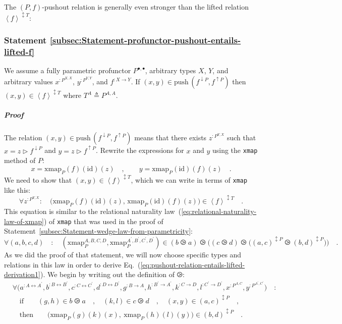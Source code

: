 The $\left(P,f\right)$-pushout relation is generally even stronger
than the lifted relation $\left<f\right>^{\updownarrow T}$:

\subsubsection{Statement \label{subsec:Statement-profunctor-pushout-entails-lifted-f}\ref{subsec:Statement-profunctor-pushout-entails-lifted-f}}

We assume a fully parametric profunctor $P^{\bullet,\bullet}$, arbitrary
types $X$, $Y$, and arbitrary values $x^{:P^{X,X}}$, $y^{:P^{Y,Y}}$,
and $f^{:X\rightarrow Y}$. If $(x,y)\in\text{push}\,(f^{\downarrow P},f^{\uparrow P})$
then $(x,y)\in\left<f\right>^{\updownarrow T}$ where $T^{A}\triangleq P^{A,A}$.

\subparagraph{Proof}

The relation $(x,y)\in\text{push}\,(f^{\downarrow P},f^{\uparrow P})$
means that there exists $z^{:P^{Y,X}}$ such that $x=z\triangleright f^{\downarrow P}$
and $y=z\triangleright f^{\uparrow P}$. Rewrite the expressions for
$x$ and $y$ using the \lstinline!xmap! method of $P$:
\[
x=\text{xmap}_{P}(f)(\text{id})(z)\quad,\quad\quad y=\text{xmap}_{P}(\text{id})(f)(z)\quad.
\]
We need to show that $(x,y)\in\left<f\right>^{\updownarrow T}$, which
we can write in terms of \lstinline!xmap! like this:
\begin{equation}
\forall z^{:P^{Y,X}}:\quad\big(\text{xmap}_{P}(f)(\text{id})(z),\,\text{xmap}_{P}(\text{id})(f)(z)\big)\in\left<f\right>^{\updownarrow T}\quad.\label{eq:pushout-relation-entails-lifted-derivation1}
\end{equation}
This equation is similar to the relational naturality law~(\ref{eq:relational-naturality-law-of-xmap})
of \lstinline!xmap! that was used in the proof of Statement~\ref{subsec:Statement-wedge-law-from-parametricity}:
\[
\forall(a,b,c,d)\quad:\quad(\text{xmap}_{P}^{A,B,C,D},\text{xmap}_{P}^{A^{\prime},B^{\prime},C^{\prime},D^{\prime}})\in(b\ogreaterthan a)\ogreaterthan\big((c\ogreaterthan d)\ogreaterthan\big((a,c)^{\updownarrow P}\ogreaterthan(b,d)^{\updownarrow P}\big)\big)\quad.
\]
As we did the proof of that statement, we will now choose specific
types and relations in this law in order to derive Eq.~(\ref{eq:pushout-relation-entails-lifted-derivation1}).
We begin by writing out the definition of $\ogreaterthan$:
\begin{align}
 & \forall\big(a^{:A\leftrightarrow A^{\prime}},b^{:B\leftrightarrow B^{\prime}},c^{:C\leftrightarrow C^{\prime}},d^{:D\leftrightarrow D^{\prime}},g^{:B\rightarrow A},h^{:B^{\prime}\rightarrow A^{\prime}},k^{:C\rightarrow D},l^{:C^{\prime}\rightarrow D^{\prime}},x^{:P^{A,C}},y^{:P^{A^{\prime},C^{\prime}}}\big)\quad:\nonumber \\
 & \quad\text{if}\quad\quad(g,h)\in b\ogreaterthan a\quad,\quad(k,l)\in c\ogreaterthan d\quad,\quad(x,y)\in(a,c)^{\updownarrow P}\quad,\nonumber \\
 & \quad\text{then}\quad\quad\big(\text{xmap}_{P}(g)(k)(x),\:\text{xmap}_{P}(h)(l)(y)\big)\in(b,d)^{\updownarrow P}\quad.\label{eq:xmap-relational-law-derivation3}
\end{align}

